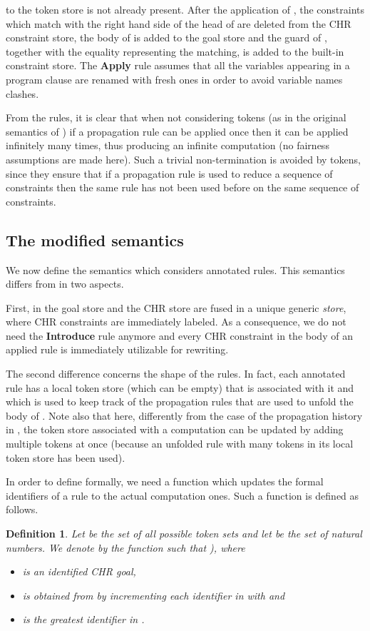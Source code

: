 \documentclass{tlp}
\newtheorem{definition}{Definition} \newtheorem{proposition}{Proposition} \newtheorem{example}{Example} \newtheorem{corollary}{Corollary} \newtheorem{theorem}{Theorem} \newtheorem{lemma}{Lemma}
\begin{document}
to the token store is not already
present. After the application of ,
the constraints which match with the right hand side of the head
of  are deleted from the CHR constraint store, the body of  is added to
the goal store and the guard of , together with the equality representing the matching, is added to the built-in constraint store.
The \textbf{Apply} rule assumes that all
the variables appearing in a program clause are renamed with fresh ones in order to
avoid variable names clashes.

From the rules, it is clear that when not considering
tokens (as in the original semantics of \cite{Fru98}) if a propagation rule can be
applied once  then it can be applied infinitely many times, thus
producing an infinite computation (no fairness assumptions are
made here). Such a trivial non-termination is avoided by tokens, since they ensure that
if a propagation rule is used to reduce a sequence of constraints
then the same rule has not been used before on the same
sequence of constraints.


\subsection{The modified semantics }
We now define the semantics  which considers annotated rules.
This semantics differs from  in two aspects.

First, in 
the goal store and the CHR store are fused in a unique generic \emph{store}, where
CHR constraints are immediately labeled. As a consequence, we do not
need  the {\bf Introduce} rule anymore and every CHR
constraint in the body of an applied rule is immediately
utilizable for rewriting.

The second difference concerns the shape of the rules. In fact,
each annotated rule  has  a local token store (which can be
empty) that is associated with it and which is used to keep track of
the propagation rules that are used to unfold the body of .
Note also that here, differently from the case of the propagation
history in , the token store associated with a computation can be updated
by adding multiple tokens at once (because an unfolded rule with many
tokens in its local token store has been used).

In order to define   formally,
we need a function   which updates
the formal identifiers of a rule to the actual computation ones. Such a function 
is defined as follows.

\begin{definition}\label{definst}
 Let  be the set of all possible token
sets and let  be the set of natural numbers. We denote
by  the function such that
), where
\begin{itemize}
    \item  is an identified CHR goal,
    \item  is obtained from  by
    incrementing each identifier in  with  and
    \item  is the greatest identifier in .
\end{itemize}
\end{definition}
\end{document}
